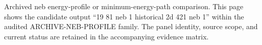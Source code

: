 Archived neb energy-profile or minimum-energy-path comparison. This page shows the candidate output ``19 81 neb 1 historical 2d 421 neb 1'' within the audited ARCHIVE-NEB-PROFILE family. The panel identity, source scope, and current status are retained in the accompanying evidence matrix.
